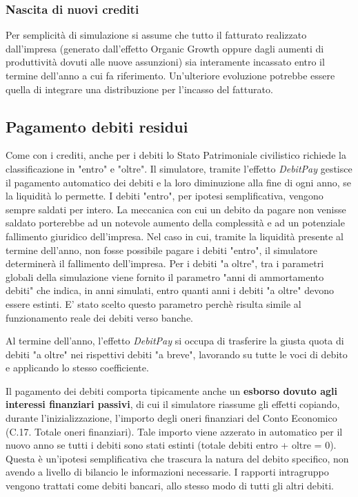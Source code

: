 \documentclass{article}
\begin{document}
\subsubsection{Nascita di nuovi crediti}
Per semplicità di simulazione si assume che tutto il fatturato realizzato dall'impresa (generato dall'effetto Organic Growth oppure dagli aumenti di produttività dovuti alle nuove assunzioni) sia interamente incassato entro il termine dell'anno a cui fa riferimento. 
Un'ulteriore evoluzione potrebbe essere quella di integrare una distribuzione per l'incasso del fatturato. 
\subsection{Pagamento debiti residui}
Come con i crediti, anche per i debiti lo Stato Patrimoniale civilistico richiede la classificazione in "entro" e "oltre". 
Il simulatore, tramite l'effetto \textit{DebitPay} gestisce il pagamento automatico dei debiti e la loro diminuzione alla fine di ogni anno, se la liquidità lo permette. 
I debiti "entro", per ipotesi semplificativa, vengono sempre saldati per intero. La meccanica con cui un debito da pagare non venisse saldato porterebbe ad un notevole aumento della complessità e ad un potenziale fallimento giuridico dell'impresa. 
Nel caso in cui, tramite la liquidità presente al termine dell'anno, non fosse possibile pagare i debiti "entro", il simulatore determinerà il fallimento dell'impresa. 
Per i debiti "a oltre", tra i parametri globali della simulazione viene fornito il parametro "anni di ammortamento debiti" che indica, in anni simulati, entro quanti anni i debiti "a oltre" devono essere estinti. E' stato scelto questo parametro perchè risulta simile al funzionamento reale dei debiti verso banche. 

Al termine dell'anno, l'effetto \textit{DebitPay} si occupa di trasferire la giusta quota di debiti "a oltre" nei rispettivi debiti "a breve", lavorando su tutte le voci di debito e applicando lo stesso coefficiente. 


Il pagamento dei debiti comporta tipicamente anche un \textbf{esborso dovuto agli interessi finanziari passivi}, di cui il simulatore riassume gli effetti copiando, durante l'inizializzazione, l'importo degli oneri finanziari del Conto Economico (C.17. Totale oneri finanziari). Tale importo viene azzerato in automatico per il nuovo anno se tutti i debiti sono stati estinti (totale debiti entro + oltre = 0). 
Questa è un'ipotesi semplificativa che trascura la natura del debito specifico, non avendo a livello di bilancio le informazioni necessarie. I rapporti intragruppo vengono trattati come debiti bancari, allo stesso modo di tutti gli altri debiti. 
\end{document}
